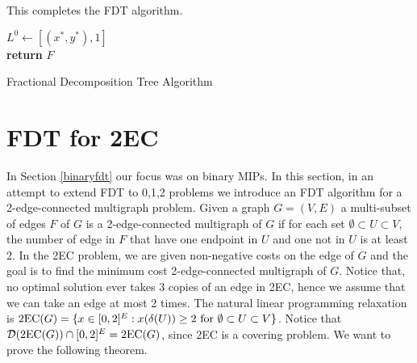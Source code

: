 \documentclass[runningheads]{llncs}
\begin{document}
This completes the FDT algorithm. 


\begin{algorithm}[H]\label{FDTFull}
	$L^0\leftarrow [(x^*,y^*),1]$\\
	\textbf{return} $F$
	\caption{Fractional Decomposition Tree Algorithm}
\end{algorithm}
\section{FDT for 2EC}\label{2EC}

In Section \ref{binaryfdt} our focus was on binary MIPs. In this section, in an attempt to extend FDT to 0,1,2 problems we introduce an FDT algorithm for a 2-edge-connected multigraph problem. Given a graph $G=(V,E)$ a multi-subset of edges $F$ of $G$ is a 2-edge-connected multigraph of $G$ if for each set $\emptyset\subset U \subset V$, the number of edge in $F$ that have one endpoint in $U$ and one not in $U$ is at least 2. In the 2EC problem, we are given non-negative costs on the edge of $G$ and the goal is to find the minimum cost 2-edge-connected multigraph of $G$. Notice that, no optimal solution ever takes 3 copies of an edge in 2EC, hence we assume that we can take an edge at most 2 times. The natural linear programming relaxation is $\operatorname{2EC}(G) = \{x\in [0,2]^E: x(\delta(U))\geq 2 \mbox{ for } \emptyset \subset U \subset V\}$. Notice that $\operatorname{\mathcal{D}}(\operatorname{2EC}(G))\cap [0,2]^{E} = \operatorname{2EC}(G)$, since 2EC is a covering problem. We want to prove the following theorem. 
\end{document}
